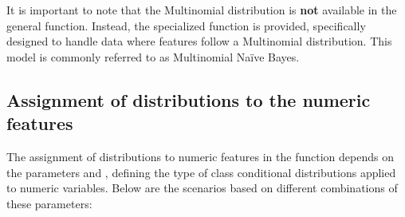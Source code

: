 \documentclass{article}\usepackage[]{graphicx}\usepackage[]{xcolor}
\begin{document}
It is important to note that the Multinomial distribution is \textbf{not} available in the general \textcolor{darkgreen}{{}} function. Instead, the specialized function \textcolor{darkgreen}{{}} is provided, specifically designed to handle data where features follow a Multinomial distribution. This model is commonly referred to as Multinomial Na\"ive Bayes.


\subsection{Assignment of distributions to the numeric features}

The assignment of distributions to numeric features in the \textcolor{darkgreen}{{}} function depends on the parameters \textcolor{darkgreen}{{}} and \textcolor{darkgreen}{{}}, defining the type of class conditional distributions applied to numeric variables. Below are the scenarios based on different combinations of these parameters:
\end{document}
